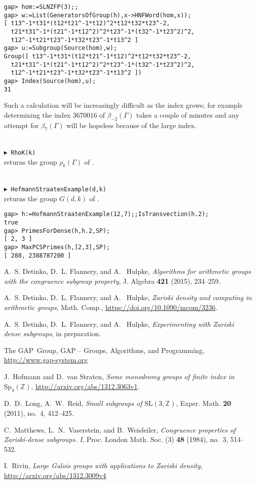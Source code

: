 \documentclass[a4paper,12pt]{amsart}
\newcommand{\Z}{\mathbb{Z}}
\newcommand{\SL}{\mathrm{SL}}
\newcommand{\Sp}{\mathrm{Sp}}
\def\mycmd#1{\ \smallskip\\$\blacktriangleright$\ #1\\}
\begin{document}
\begin{verbatim}
gap> hom:=SLNZFP(3);;
gap> w:=List(GeneratorsOfGroup(h),x->HNFWord(hom,x));
[ t13^-1*t31*(t12*t21^-1*t12)^2*t12*t32*t23^-2,
  t21*t31^-1*(t21^-1*t12^2)^2*t23^-1*(t32^-1*t23^2)^2,
  t12^-1*t21*t23^-1*t32*t23^-1*t13^2 ]
gap> u:=Subgroup(Source(hom),w);
Group([ t13^-1*t31*(t12*t21^-1*t12)^2*t12*t32*t23^-2,
  t21*t31^-1*(t21^-1*t12^2)^2*t23^-1*(t32^-1*t23^2)^2,
  t12^-1*t21*t23^-1*t32*t23^-1*t13^2 ])
gap> Index(Source(hom),u);
31
\end{verbatim}

Such a calculation will be increasingly difficult as the index grows; for
example determining the index $3670016$ of $\beta_{-2}(\Gamma)$ takes a
couple of minutes and any attempt for $\beta_{7}(\Gamma)$ will be hopeless
because of the large index.

\mycmd{{\tt RhoK(k)}}
returns the group $\rho_k(\Gamma)$ of \cite{LongReidI}.

\mycmd{{\tt HofmannStraatenExample(d,k)}}
returns the group $G(d,k)$ of \cite{HofStrat}.
\begin{verbatim}
gap> h:=HofmannStraatenExample(12,7);;IsTransvection(h.2);
true
gap> PrimesForDense(h,h.2,SP);
[ 2, 3 ]
gap> MaxPCSPrimes(h,[2,3],SP);
[ 288, 2388787200 ]
\end{verbatim}



\begin{thebibliography}{10}

A.~S. Detinko, D.~L. Flannery, and A.~ Hulpke, \textit{Algorithms for
arithmetic groups with the congruence subgroup property}, J. Algebra \textbf{421} (2015), 234--259.

A.~S. Detinko, D.~L. Flannery, and A.~ Hulpke, 
\textit{Zariski density and computing in arithmetic groups}, Math. Comp.,
\url{https://doi.org/10.1090/mcom/3236}.

A.~S. Detinko, D.~L. Flannery, and A.~ Hulpke, \textit{Experimenting with
Zariski dense subgroups}, %
in preparation.

The GAP~Group, {GAP} -- {G}roups, {A}lgorithms, and {P}rogramming,
\noindent
\url{http://www.gap-system.org}

J.~Hofmann and D.~van Straten, \textit{Some monodromy groups of finite
index in $\Sp_4(\Z)$}, \url{http://arxiv.org/abs/1312.3063v1}.

D.~D.~Long, A.~W.~Reid, \textit{Small subgroups of $\SL(3, \mathbb{Z})$}, 
Exper. Math.  \textbf{20} (2011),
no.~4, 412--425.

C.~Matthews, L.~N.~Vaserstein, and B.~Weisfeiler, \textit{Congruence
properties of Zariski-dense subgroups. I}, Proc. London Math. Soc. (3)
\textbf{48} (1984), no.~3, 514--532.


I.~Rivin, \textit{Large Galois groups with applications to Zariski
density}, \url{http://arxiv.org/abs/1312.3009v4}

\end{thebibliography}
\end{document}
